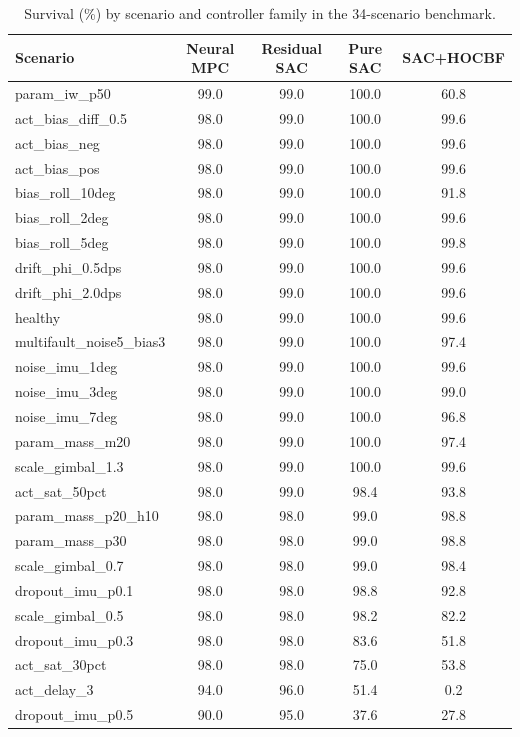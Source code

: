 \documentclass[preprint,12pt,authoryear=false]{elsarticle}
\theoremstyle{remark}\newtheorem{remark}{Remark}
\theoremstyle{plain}\newtheorem{proposition}{Proposition}\newtheorem{lemma}{Lemma}
\theoremstyle{definition}\newtheorem{assumption}{Assumption}
\begin{document}
\begin{table}[h]\centering\footnotesize
\caption{Survival (\%) by scenario and controller family in the 34-scenario benchmark.}\label{tab:app}
\begin{tabular}{lcccc}\toprule
Scenario & Neural MPC & Residual SAC & Pure SAC & SAC+HOCBF\\\midrule
param\_iw\_p50 & 99.0 & 99.0 & 100.0 & 60.8\\
act\_bias\_diff\_0.5 & 98.0 & 99.0 & 100.0 & 99.6\\
act\_bias\_neg & 98.0 & 99.0 & 100.0 & 99.6\\
act\_bias\_pos & 98.0 & 99.0 & 100.0 & 99.6\\
bias\_roll\_10deg & 98.0 & 99.0 & 100.0 & 91.8\\
bias\_roll\_2deg & 98.0 & 99.0 & 100.0 & 99.6\\
bias\_roll\_5deg & 98.0 & 99.0 & 100.0 & 99.8\\
drift\_phi\_0.5dps & 98.0 & 99.0 & 100.0 & 99.6\\
drift\_phi\_2.0dps & 98.0 & 99.0 & 100.0 & 99.6\\
healthy & 98.0 & 99.0 & 100.0 & 99.6\\
multifault\_noise5\_bias3 & 98.0 & 99.0 & 100.0 & 97.4\\
noise\_imu\_1deg & 98.0 & 99.0 & 100.0 & 99.6\\
noise\_imu\_3deg & 98.0 & 99.0 & 100.0 & 99.0\\
noise\_imu\_7deg & 98.0 & 99.0 & 100.0 & 96.8\\
param\_mass\_m20 & 98.0 & 99.0 & 100.0 & 97.4\\
scale\_gimbal\_1.3 & 98.0 & 99.0 & 100.0 & 99.6\\
act\_sat\_50pct & 98.0 & 99.0 & 98.4 & 93.8\\
param\_mass\_p20\_h10 & 98.0 & 98.0 & 99.0 & 98.8\\
param\_mass\_p30 & 98.0 & 98.0 & 99.0 & 98.8\\
scale\_gimbal\_0.7 & 98.0 & 98.0 & 99.0 & 98.4\\
dropout\_imu\_p0.1 & 98.0 & 98.0 & 98.8 & 92.8\\
scale\_gimbal\_0.5 & 98.0 & 98.0 & 98.2 & 82.2\\
dropout\_imu\_p0.3 & 98.0 & 98.0 & 83.6 & 51.8\\
act\_sat\_30pct & 98.0 & 98.0 & 75.0 & 53.8\\
act\_delay\_3 & 94.0 & 96.0 & 51.4 & 0.2\\
dropout\_imu\_p0.5 & 90.0 & 95.0 & 37.6 & 27.8\\

\end{tabular}
\end{table}
\end{document}
